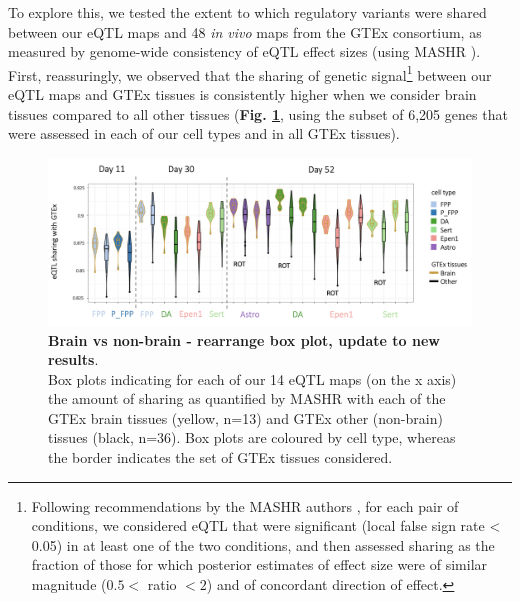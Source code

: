 To explore this, we tested the extent to which regulatory variants were shared between our eQTL maps and 48 
\textit{in vivo} maps from the GTEx consortium, 
as measured by genome-wide consistency of eQTL effect sizes (using MASHR \cite{urbut2019flexible}).
First, reassuringly, we observed that the sharing of genetic signal\footnote{Following recommendations by the MASHR authors \cite{stephens2020eqtl}, for each pair of conditions, we considered eQTL that were significant (local false sign rate < 0.05) in at least one of the two conditions, and then assessed sharing as the fraction of those for which posterior estimates of effect size were of similar magnitude ($0.5 <$ ratio $<2$) and of concordant direction of effect.} between our eQTL maps and GTEx tissues is consistently higher when we consider brain tissues compared to all other tissues (\textbf{Fig. \ref{fig:neuroseq_and_gtex_brain_specificity}}, using the subset of 6,205 genes that were assessed in each of our cell types and in all GTEx tissues). 
\\

\begin{figure}[h]
\centering
\includegraphics[width=16cm]{Chapter5/Fig/neuroseq_gtex_brain_nonbrain_boxplots.png}
\caption[Brain vs non-brain]{\textbf{Brain vs non-brain - rearrange box plot, update to new results}.\\
Box plots indicating for each of our 14 eQTL maps (on the x axis) the amount of sharing as quantified by MASHR \cite{urbut2019flexible} with each of the GTEx brain tissues (yellow, n=13) and GTEx other (non-brain) tissues (black, n=36).
Box plots are coloured by cell type, whereas the border indicates the set of GTEx tissues considered.}
\label{fig:neuroseq_and_gtex_brain_specificity}
\end{figure}

